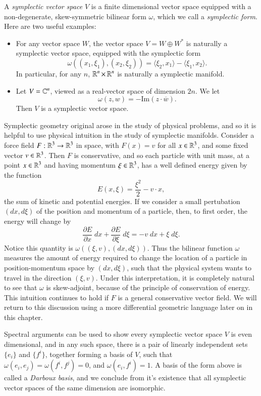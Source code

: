 A \emph{symplectic vector space} $V$ is a finite dimensional vector space equipped with a non-degenerate, skew-symmetric bilinear form $\omega$, which we call a \emph{symplectic form}. Here are two useful examples:
%
\begin{itemize}
    \item For any vector space $W$, the vector space $V = W \oplus W^*$ is naturally a symplectic vector space, equipped with the symplectic form
    \[ \omega((x_1,\xi_1),(x_2,\xi_2)) = \langle \xi_2, x_1 \rangle - \langle \xi_1, x_2 \rangle. \]
    In particular, for any $n$, $\operatorname{\mathbb{R}}^n \times \operatorname{\mathbb{R}}^n$ is naturally a symplectic manifold.

    \item Let $V = \operatorname{\mathbb{C}}^n$, viewed as a real-vector space of dimension $2n$. We let
    \[ \omega(z,w) = - \text{Im} \left( z \cdot \overline{w} \right). \]
    Then $V$ is a symplectic vector space.
\end{itemize}

\begin{remark}
    Symplectic geometry original arose in the study of physical problems, and so it is helpful to use physical intuition in the study of symplectic manifolds. Consider a force field $F: \operatorname{\mathbb{R}}^3 \to \operatorname{\mathbb{R}}^3$ in space, with $F(x) = v$ for all $x \in \operatorname{\mathbb{R}}^3$, and some fixed vector $v \in \operatorname{\mathbb{R}}^3$. Then $F$ is conservative, and so each particle with unit mass, at a point $x \in \operatorname{\mathbb{R}}^3$ and having momentum $\xi \in \operatorname{\mathbb{R}}^3$, has a well defined energy given by the function
    \[ E(x,\xi) = \frac{\xi^2}{2} - v \cdot x, \]
    the sum of kinetic and potential energies. If we consider a small pertubation $(dx,d\xi)$ of the position and momentum of a particle, then, to first order, the energy will change by
    \[ \frac{\partial E}{\partial x}\; dx + \frac{\partial E}{\partial \xi}\; d\xi = - v\; dx + \xi\; d\xi. \]
    Notice this quantity is $\omega( (\xi,v), (dx,d\xi))$. Thus the bilinear function $\omega$ measures the amount of energy required to change the location of a particle in position-momentum space by $(dx,d\xi)$, such that the physical system wants to travel in the direction $(\xi,v)$. Under this interpretation, it is completely natural to see that $\omega$ is skew-adjoint, because of the principle of conservation of energy. This intuition continues to hold if $F$ is a general conservative vector field. We will return to this discussion using a more differential geometric language later on in this chapter.
\end{remark}
%
Spectral arguments can be used to show every symplectic vector space $V$ is even dimensional, and in any such space, there is a pair of linearly independent sets $\{ e_i \}$ and $\{ f^i \}$, together forming a basis of $V$, such that $\omega(e_i,e_j) = \omega(f^i,f^j) = 0$, and $\omega(e_i,f^i) = 1$. A basis of the form above is called a \emph{Darboux basis}, and we conclude from it's existence that all symplectic vector spaces of the same dimension are isomorphic.

